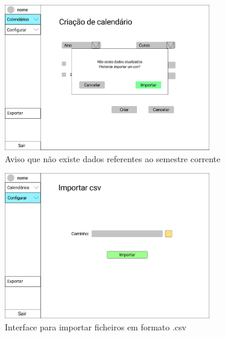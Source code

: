 \documentclass[11pt, twoside]{report}
\begin{document}
\begin{figure}[H] 
	\centering 
	\includegraphics[width=0.8\textwidth,height=0.8\textheight,keepaspectratio]{image/prototipowireframes/criarCalendariosAviso}
	\caption{Aviso que não existe dados referentes ao semestre corrente}
	\label{avisoimportarcsv}
\end{figure}


\begin{figure}[H] 
	\centering 
	\includegraphics[width=0.8\textwidth,height=0.8\textheight,keepaspectratio]{image/prototipowireframes/importar}
	\caption{Interface para importar ficheiros em formato .csv}
	\label{importarcsv}
\end{figure}
\end{document}
